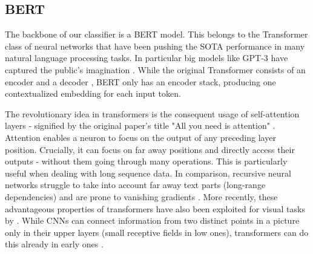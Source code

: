 \documentclass[msc,deptreport,ai]{infthesis} %
\begin{document}
	\subsection{BERT}
	\label{subsec:BERT}
		The backbone of our classifier is a \gls{BERT} \cite{devlin_bert_2019} model. This belongs to the Transformer class of neural networks that have been pushing the \gls{SOTA} performance in many natural language processing tasks. In particular big models like GPT-3 \cite{brown_language_2020} have captured the public's imagination \cite{weinberg_philosophers_2020}. While the original Transformer consists of an encoder and a decoder \cite{vaswani_attention_2017}, \gls{BERT} only has an encoder stack, producing one contextualized embedding for each input token.

		The revolutionary idea in transformers is the consequent usage of self-attention layers - signified by the original paper's title "All you need is attention" \cite{vaswani_attention_2017}. Attention enables a neuron to focus on the output of any preceding layer position. Crucially, it can focus on far away positions and directly access their outputs - without them going through many operations. This is particularly useful when dealing with long sequence data. In comparison, recursive neural networks struggle to take into account far away text parts (long-range dependencies) and are prone to vanishing gradients \cite{vaswani_attention_2017, yannic_kilcher_attention_2017,  dosovitskiy_image_2020}. More recently, these advantageous properties of transformers have also been exploited for visual tasks by \cite{dosovitskiy_image_2020}. While \glspl{CNN} can connect information from two distinct points in a picture only in their upper layers (small receptive fields in low ones), transformers can do this already in early ones \cite{dosovitskiy_image_2020}.
		
\end{document}
